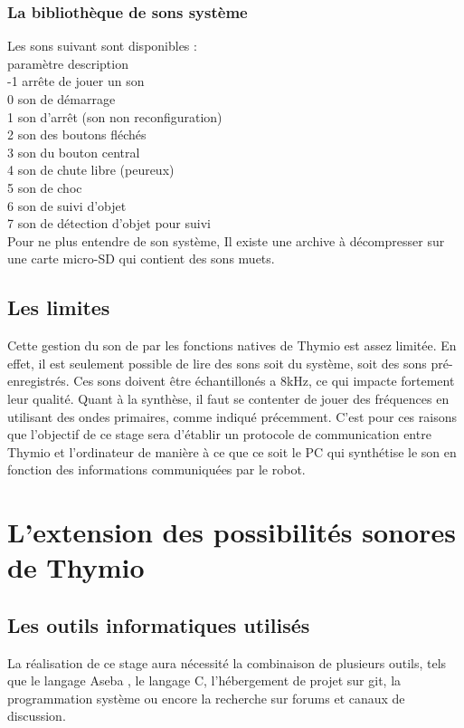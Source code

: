 \documentclass[a4paper, 12pt]{report}
\begin{document}
\subsection{La bibliothèque de sons système}
Les sons suivant sont disponibles :\\
paramètre           description\\
     -1             arrête de jouer un son\\
      0             son de démarrage\\
      1             son d'arrêt (son non reconfiguration)\\
      2             son des boutons fléchés\\
      3             son du bouton central\\
      4             son de chute libre (peureux)\\
      5             son de choc\\
      6             son de suivi d'objet\\
      7             son de détection d'objet pour suivi\\
Pour ne plus entendre de son système, Il existe une archive à décompresser sur une carte micro-SD qui contient des sons muets.

\section{Les limites}
Cette gestion du son de par les fonctions natives de Thymio \pageref{thymio} est assez limitée. En effet, il est seulement possible de lire des sons soit du système, soit des sons pré-enregistrés. Ces sons doivent être échantillonés a 8kHz, ce qui impacte fortement leur qualité. Quant à la synthèse, il faut se contenter de jouer des fréquences en utilisant des ondes primaires, comme indiqué précemment. C'est pour ces raisons que l'objectif de ce stage sera d'établir un protocole de communication entre Thymio \pageref{thymio} et l'ordinateur de manière à ce que ce soit le PC qui synthétise le son en fonction des informations communiquées par le robot.

\chapter{L'extension des possibilités sonores de Thymio \pageref{thymio} }
\section{Les outils informatiques utilisés}
La réalisation de ce stage aura nécessité la combinaison de plusieurs outils, tels que le langage Aseba \pageref{aseba}, le langage C, l'hébergement de projet sur git, la programmation système ou encore la recherche sur forums et canaux de discussion.
\end{document}
